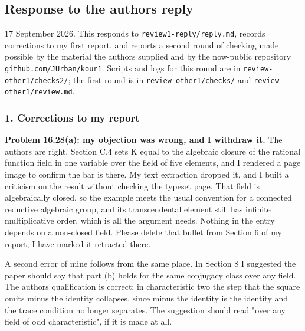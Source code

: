 \hypertarget{review2-md-response-to-the-authors-reply}{%
\subsection*{Response to the authors\textquotesingle{}
reply}\label{review2-md-response-to-the-authors-reply}}

17 September 2026. This responds to \nolinkurl{review1-reply/reply.md},
records corrections to my first report, and reports a second round of
checking made possible by the material the authors supplied and by the
now-public repository \nolinkurl{github.com/JUrban/kour1}. Scripts and
logs for this round are in \nolinkurl{review-other1/checks2/}; the first
round is in \nolinkurl{review-other1/checks/} and
\nolinkurl{review-other1/review.md}.

\hypertarget{review2-md-corrections-to-my-report}{%
\subsubsection*{1. Corrections to my
report}\label{review2-md-corrections-to-my-report}}

\textbf{Problem 16.28(a): my objection was wrong, and I withdraw it.}
The authors are right. Section C.4 sets K equal to the algebraic closure
of the rational function field in one variable over the field of five
elements, and I rendered a page image to confirm the bar is there. My
text extraction dropped it, and I built a criticism on the result
without checking the typeset page. That field is algebraically closed,
so the example meets the usual convention for a connected reductive
algebraic group, and its transcendental element still has infinite
multiplicative order, which is all the argument needs. Nothing in the
entry depends on a non-closed field. Please delete that bullet from
Section 6 of my report; I have marked it retracted there.

A second error of mine follows from the same place. In Section 8 I
suggested the paper should say that part (b) holds for the same
conjugacy class over any field. The authors\textquotesingle{}
qualification is correct: in characteristic two the step that the square
omits minus the identity collapses, since minus the identity is the
identity and the trace condition no longer separates. The suggestion
should read "over any field of odd characteristic", if it is made at
all.

